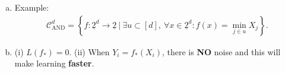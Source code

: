 \documentclass[twoside]{article}
\begin{document}
\begin{remark}
    \begin{enumerate}[(a)] 
        \item Example:
        \begin{align*}
            \mathcal{C}_{\text{AND}}^d= \left\{  f:   \underline{2}^d \rightarrow \underline{2}\ | \ \exists u \subset[d],\ \forall x\in \underline{2}^d: f(x) = \min_{j\in u} X_j \right\}.
        \end{align*}
        \item (i) $L(f_*)=0$. (ii) When $Y_i=f_*(X_i)$, there is \textbf{NO} noise and this will make learning \textbf{faster}.
    \end{enumerate}  
\end{remark}
\end{document}
